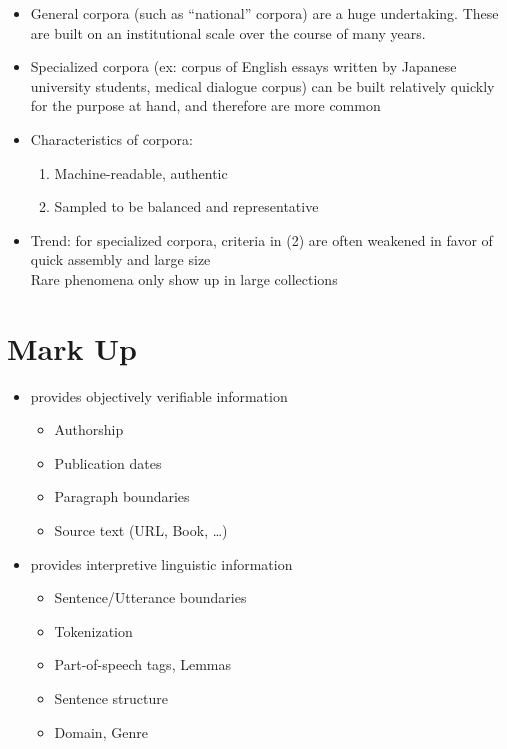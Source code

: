 \documentclass[a4paper,landscape,headrule,footrule,dvips]{foils}
\begin{document}
\begin{CJK}{UTF8}{min}
\begin{itemize}
\item General corpora (such as ``national'' corpora) are a huge undertaking.
These are built on an institutional scale over the course of many years.
\item  Specialized corpora (ex: corpus of English essays written by Japanese
university students, medical dialogue corpus) can be built relatively
quickly for the purpose at hand, and therefore are more common
\item Characteristics of corpora:
  \begin{enumerate}
  \item Machine-readable, authentic
  \item Sampled to be balanced and representative
  \end{enumerate}
\item  Trend: for specialized corpora, criteria in (2) are often weakened in favor of quick assembly and large size 
\\ Rare phenomena only show up in large collections
\end{itemize}


\section{Mark Up}


  \begin{itemize}
  \item {} provides objectively verifiable information
    \begin{itemize}
    \item Authorship
    \item Publication dates
    \item Paragraph boundaries
    \item Source text (URL, Book, \ldots)
    \end{itemize}
  \item {} provides interpretive linguistic information
    \begin{itemize}
    \item Sentence/Utterance boundaries
    \item Tokenization
    \item Part-of-speech tags, Lemmas
    \item Sentence structure
    \item Domain, Genre
    \end{itemize}
  \end{itemize}



\end{CJK}
\end{document}
